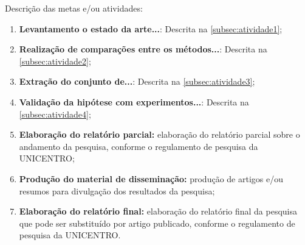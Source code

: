 Descrição das metas e/ou atividades:
\begin{enumerate}
    \item \textbf{Levantamento o estado da arte...}: Descrita na \autoref{subsec:atividade1};
    \item \textbf{Realização de comparações entre os métodos...}: Descrita na \autoref{subsec:atividade2};
    \item \textbf{Extração do conjunto de...}: Descrita na \autoref{subsec:atividade3};    
    \item \textbf{Validação da hipótese com experimentos...}: Descrita na \autoref{subsec:atividade4};
    \item \textbf{Elaboração do relatório parcial:} elaboração do relatório parcial sobre o andamento da pesquisa, conforme o regulamento de pesquisa da UNICENTRO;
    \item \textbf{Produção do material de disseminação:} produção de artigos e/ou resumos para divulgação dos resultados da pesquisa;
    \item \textbf{Elaboração do relatório final:} elaboração do relatório final da pesquisa que pode ser substituído por artigo publicado, conforme o regulamento de pesquisa da UNICENTRO.
\end{enumerate}